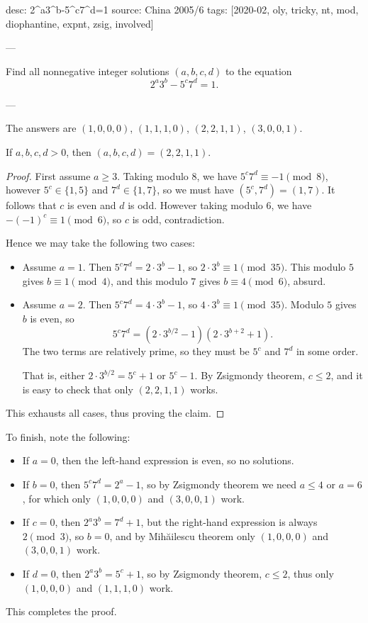 desc: 2^a3^b-5^c7^d=1
source: China 2005/6
tags: [2020-02, oly, tricky, nt, mod, diophantine, expnt, zsig, involved]

---

Find all nonnegative integer solutions $(a,b,c,d)$ to the equation \[2^a3^b-5^c7^d=1.\]

---

The answers are $(1,0,0,0)$, $(1,1,1,0)$, $(2,2,1,1)$, $(3,0,0,1)$.
\begin{claim*}
    If $a,b,c,d>0$, then $(a,b,c,d)=(2,2,1,1)$.
\end{claim*}
\begin{proof}
    First assume $a\ge3$. Taking modulo $8$, we have $5^c7^d\equiv-1\pmod8$, however $5^c\in\{1,5\}$ and $7^d\in\{1,7\}$, so we must have $(5^c,7^d)=(1,7)$. It follows that $c$ is even and $d$ is odd. However taking modulo $6$, we have $-(-1)^c\equiv1\pmod6$, so $c$ is odd, contradiction.

    Hence we may take the following two cases:
    \begin{itemize}
        \item Assume $a=1$. Then $5^c7^d=2\cdot3^b-1$, so $2\cdot3^b\equiv1\pmod{35}$. This modulo $5$ gives $b\equiv1\pmod4$, and this modulo $7$ gives $b\equiv4\pmod6$, absurd.
        \item Assume $a=2$. Then $5^c7^d=4\cdot3^b-1$, so $4\cdot3^b\equiv1\pmod{35}$. Modulo $5$ gives $b$ is even, so \[5^c7^d=(2\cdot3^{b/2}-1)(2\cdot3^{b+2}+1).\]
            The two terms are relatively prime, so they must be $5^c$ and $7^d$ in some order.

            That is, either $2\cdot3^{b/2}=5^c+1$ or $5^c-1$. By Zsigmondy theorem, $c\le2$, and it is easy to check that only $(2,2,1,1)$ works.
    \end{itemize}
    This exhausts all cases, thus proving the claim.
\end{proof}

To finish, note the following:
\begin{itemize}
    \item If $a=0$, then the left-hand expression is even, so no solutions.
    \item If $b=0$, then $5^c7^d=2^a-1$, so by Zsigmondy theorem we need $a\le4$ or $a=6$, for which only $(1,0,0,0)$ and $(3,0,0,1)$ work.
    \item If $c=0$, then $2^a3^b=7^d+1$, but the right-hand expression is always $2\pmod3$, so $b=0$, and by Mih\u ailescu theorem only $(1,0,0,0)$ and $(3,0,0,1)$ work.
    \item If $d=0$, then $2^a3^b=5^c+1$, so by Zsigmondy theorem, $c\le2$, thus only $(1,0,0,0)$ and $(1,1,1,0)$ work.
\end{itemize}
This completes the proof.
